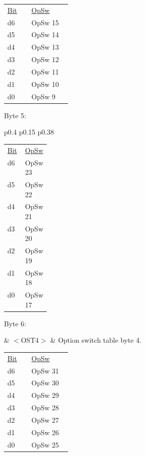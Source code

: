 \begin{tabular}{p{0.05\linewidth} p{0.1\linewidth} } 
\underline{Bit} & \underline{OpSw} \\
d6 & OpSw 15\\
d5 & OpSw 14\\
d4 & OpSw 13\\
d3 & OpSw 12\\
d2 & OpSw 11\\
d1 & OpSw 10\\
d0 & OpSw 9\\
\end{tabular}

Byte 5:

\begin{tabular}{p{0.4\linewidth} p{0.15\linewidth} p{0.38\linewidth}} 
\begin{tabular}{|p{0.3cm}|p{0.3cm}|p{0.3cm}|p{0.3cm}|p{0.3cm}|p{0.3cm}|p{0.3cm}|p{0.3cm}|}
\hline
0 & d6 & d5 & d4 & d3 & d2 & d1 & d0\\
\hline
\end{tabular}
& $<$OST3$>$ & Option switch table byte 3.\\
\end{tabular}

\begin{tabular}{p{0.05\linewidth} p{0.1\linewidth} } 
\underline{Bit} & \underline{OpSw} \\
d6 & OpSw 23\\
d5 & OpSw 22\\
d4 & OpSw 21\\
d3 & OpSw 20\\
d2 & OpSw 19\\
d1 & OpSw 18\\
d0 & OpSw 17\\
\end{tabular}

Byte 6:

& $<$OST4$>$ & Option switch table byte 4.\\
\end{tabular}

\begin{tabular}{p{0.05\linewidth} p{0.1\linewidth} } 
\underline{Bit} & \underline{OpSw} \\
d6 & OpSw 31\\
d5 & OpSw 30\\
d4 & OpSw 29\\
d3 & OpSw 28\\
d2 & OpSw 27\\
d1 & OpSw 26\\
d0 & OpSw 25\\
\end{tabular}

